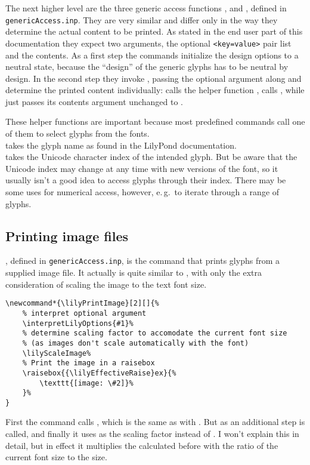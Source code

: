 \documentclass{OLLbook}
\begin{document}
\medskip
The next higher level are the three generic access functions ,  and , defined in \texttt{genericAccess.inp}.
They are very similar and differ only in the way they determine the actual content to be printed.
As stated in the end user part of this documentation they expect two arguments, the optional \texttt{<key=value>} pair list and the contents.
As a first step the commands initialize the design options to a neutral state, because the “design” of the generic glyphs has to be neutral by design.
In the second step they invoke , passing the optional argument along and determine the printed content individually:
 calls the helper function ,  calls , while  just passes its contents argument unchanged to .

\medskip
These helper functions are important because most predefined commands call one of them to select glyphs from the \emmentaler fonts.\\
 takes the glyph name as found in the LilyPond documentation.\\
 takes the Unicode character index of the intended glyph.
But be aware that the Unicode index may change at any time with new versions of the \emmentaler font, so it usually isn't a good idea to access glyphs through their index.
There may be some uses for numerical access, however, e.\,g.\ to iterate through a range of glyphs.

\subsection{Printing image files}
\label{subsec:printing_image_files}
, defined in \texttt{genericAccess.inp}, is the command that prints glyphs from a supplied image file.
It actually is quite similar to , with only the extra consideration of scaling the image to the text font size.

\begin{verbatim}
\newcommand*{\lilyPrintImage}[2][]{%
    % interpret optional argument
    \interpretLilyOptions{#1}%
    % determine scaling factor to accomodate the current font size 
    % (as images don't scale automatically with the font)
    \lilyScaleImage%
    % Print the image in a raisebox
    \raisebox{{\lilyEffectiveRaise}ex}{%
        \texttt{[image: \#2]}%
    }%
}
\end{verbatim}
First the command calls , which is the same as with .
But as an additional step  is called, and finally it uses  as the scaling factor instead of .
I won't explain this in detail, but in effect it multiplies the  calculated before with the ratio of the current font size to the  size.
\end{document}
